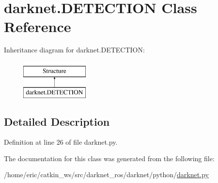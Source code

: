 \hypertarget{classdarknet_1_1DETECTION}{}\section{darknet.\+D\+E\+T\+E\+C\+T\+I\+ON Class Reference}
\label{classdarknet_1_1DETECTION}
Inheritance diagram for darknet.\+D\+E\+T\+E\+C\+T\+I\+ON\+:\begin{figure}[H]
\begin{center}
\leavevmode
\includegraphics[height=2.000000cm]{classdarknet_1_1DETECTION}
\end{center}
\end{figure}


\subsection{Detailed Description}


Definition at line 26 of file darknet.\+py.



The documentation for this class was generated from the following file\+:\begin{DoxyCompactItemize}
\item 
/home/eric/catkin\+\_\+ws/src/darknet\+\_\+ros/darknet/python/\mbox{\hyperlink{darknet_8py}{darknet.\+py}}\end{DoxyCompactItemize}
